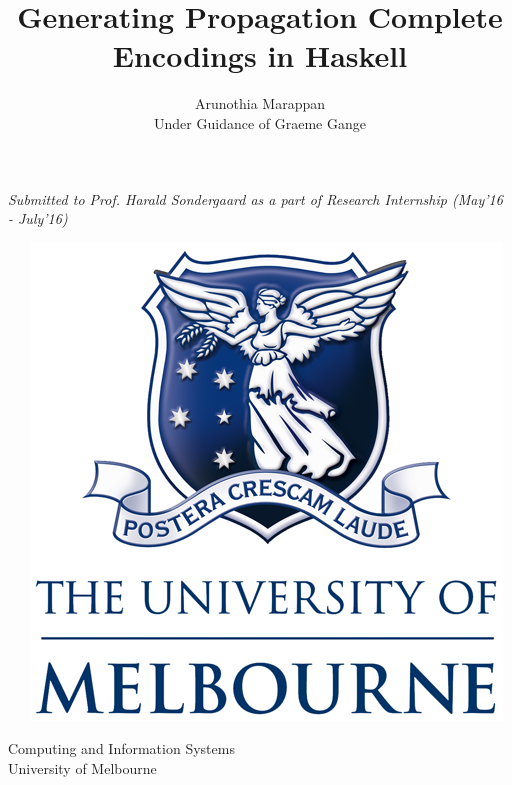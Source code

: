 \documentclass{article}
\title{Generating Propagation Complete Encodings in Haskell \\ }
\author{\vspace{2mm} \large Arunothia Marappan \\ Under Guidance of Graeme Gange }
\date{}
\theoremstyle{plain}
\begin{document}
\maketitle
\emph{Submitted to Prof. Harald Sondergaard as a part of Research Internship (May'16 - July'16)}
\vspace*{2cm}~
\begin{abstract}
 
\end{abstract}
\vspace*{2.75cm}~ \hspace*{4.75cm}~ \includegraphics[scale=.5]{UOM.png}
\begin{center}
\large{Computing and Information Systems \\ University of Melbourne}
\end{center}
\nocite{*}


\end{document}

